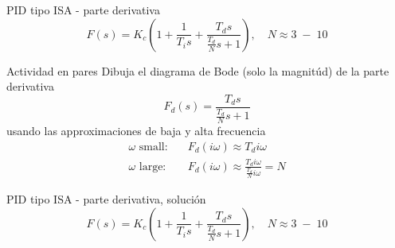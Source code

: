 \documentclass[presentation,aspectratio=1610]{beamer}
\begin{document}
\begin{frame}[label={sec:org83b39d9}]{PID tipo ISA - parte derivativa}
\[ F(s) = K_c\left( 1 + \frac{1}{T_i s} + \frac{T_d s}{\frac{T_d}{N} s + 1}\right), \quad N \approx 3\; - \; 10 \]

\alert{Actividad en pares} Dibuja el diagrama de Bode (solo la magnitúd)  de la parte derivativa \[F_d(s) = \frac{T_d s}{\frac{T_d}{N} s + 1}\] usando las approximaciones de baja y alta frecuencia
\begin{align*}
 \text{$\omega$ small:} \quad & F_d(i\omega) \approx T_d i\omega \\
 \text{$\omega$ large:} \quad & F_d(i\omega) \approx \frac{T_d i \omega }{\frac{T_d}{N} i\omega} = N
\end{align*}
\end{frame}

\begin{frame}[label={sec:orgd46db42}]{PID tipo ISA - parte derivativa, solución}
\[ F(s) = K_c\left( 1 + \frac{1}{T_i s} + \frac{T_d s}{\frac{T_d}{N} s + 1}\right), \quad N \approx 3\; - \; 10 \]

\begin{center}
  \def\Td{1}
  \def\NN{6}
\end{center}
\end{frame}
\end{document}
